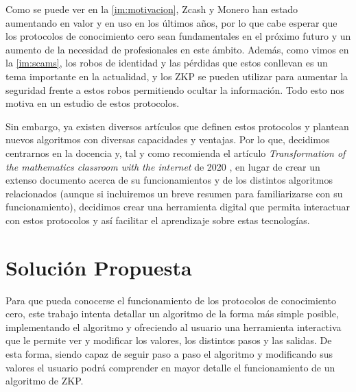 Como se puede ver en la \autoref{im:motivacion}, Zcash y  Monero han estado aumentando en valor y en uso en los últimos años, por lo que cabe esperar que los protocolos de conocimiento cero sean fundamentales en el próximo futuro y un aumento de la necesidad de profesionales en este ámbito. Además, como vimos en la \autoref{im:scams}, los robos de identidad y las pérdidas que estos conllevan es un tema importante en la actualidad, y los ZKP se pueden utilizar para aumentar la seguridad frente a estos robos permitiendo ocultar la información. Todo esto nos motiva en un estudio de estos protocolos.

Sin embargo, ya existen diversos artículos que definen estos protocolos y plantean nuevos algoritmos con diversas capacidades y ventajas. Por lo que, decidimos centrarnos en la docencia y, tal y como recomienda el artículo \emph{Transformation of the mathematics classroom with the internet} de 2020 \cite{Maths}, en lugar de crear un extenso documento acerca de su funcionamientos y de los distintos algoritmos relacionados (aunque si incluiremos un breve resumen para familiarizarse con su funcionamiento), decidimos crear una herramienta digital que permita interactuar con estos protocolos y así facilitar el aprendizaje sobre estas tecnologías.

\section{Solución Propuesta}

Para que pueda conocerse el funcionamiento de los protocolos de conocimiento cero, este trabajo intenta detallar un algoritmo de la forma más simple posible, implementando el algoritmo y ofreciendo al usuario una herramienta interactiva que le permite ver y modificar los valores, los distintos pasos y las salidas. De esta forma, siendo capaz de seguir paso a paso el algoritmo y modificando sus valores el usuario podrá comprender en mayor detalle el funcionamiento de un algoritmo de ZKP.

